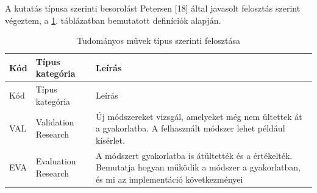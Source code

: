 \documentclass[12pt,magyar,a4paper,oneside]{scrreprt}
\begin{document}
A kutatás típusa szerinti besorolást Petersen {[}18{]} által javasolt
felosztás szerint végeztem, a \ref{tbl:SMSResKat}. táblázatban
bemutatott definíciók alapján.

\hypertarget{tbl:SMSResKat}{}
\begin{longtable}[]{@{}lll@{}}
\caption{\label{tbl:SMSResKat}Tudományos művek típus szerinti
felosztása}\tabularnewline
\toprule
\begin{minipage}[b]{0.05\columnwidth}\raggedright
Kód\strut
\end{minipage} & \begin{minipage}[b]{0.34\columnwidth}\raggedright
Típus kategória\strut
\end{minipage} & \begin{minipage}[b]{0.52\columnwidth}\raggedright
Leírás\strut
\end{minipage}\tabularnewline
\midrule
\endfirsthead
\toprule
\begin{minipage}[b]{0.05\columnwidth}\raggedright
Kód\strut
\end{minipage} & \begin{minipage}[b]{0.34\columnwidth}\raggedright
Típus kategória\strut
\end{minipage} & \begin{minipage}[b]{0.52\columnwidth}\raggedright
Leírás\strut
\end{minipage}\tabularnewline
\midrule
\endhead
\begin{minipage}[t]{0.05\columnwidth}\raggedright
VAL\strut
\end{minipage} & \begin{minipage}[t]{0.34\columnwidth}\raggedright
Validation Research\strut
\end{minipage} & \begin{minipage}[t]{0.52\columnwidth}\raggedright
Új módszereket vizsgál, amelyeket még nem ültettek át a gyakorlatba. A
felhasznált módszer lehet például kísérlet.\strut
\end{minipage}\tabularnewline
\begin{minipage}[t]{0.05\columnwidth}\raggedright
EVA\strut
\end{minipage} & \begin{minipage}[t]{0.34\columnwidth}\raggedright
Evaluation Research\strut
\end{minipage} & \begin{minipage}[t]{0.52\columnwidth}\raggedright
A módszert gyakorlatba is átültették és a értékelték. Bemutatja hogyan
működik a módszer a gyakorlatban, és mi az implementáció következményei

\end{minipage}
\end{longtable}
\end{document}
